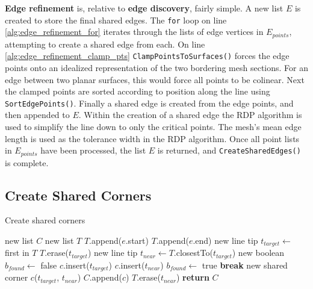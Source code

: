 \textbf{Edge refinement} is, relative to \textbf{edge discovery}, fairly simple.
A new list $E$ is created to store the final shared edges.
The \verb|for| loop on line \ref{alg:edge_refinement_for} iterates through the lists of edge vertices in $E_{points}$, attempting to create a shared edge from each.
On line \ref{alg:edge_refinement_clamp_pts} \verb|ClampPointsToSurfaces()| forces the edge points onto an idealized representation of the two bordering mesh sections.
For an edge between two planar surfaces, this would force all points to be colinear.
Next the clamped points are sorted according to position along the line using \verb|SortEdgePoints()|.
Finally a shared edge is created from the edge points, and then appended to $E$.
Within the creation of a shared edge the RDP algorithm is used to simplify the line down to only the critical points.
The mesh's mean edge length is used as the tolerance width in the RDP algorithm.
Once all point lists in $E_{points}$ have been processed, the list $E$ is returned, and \verb|CreateSharedEdges()| is complete.

\subsection{Create Shared Corners}

\begin{algorithm}[!b]
	\caption{Create shared corners}\label{alg:shared_corners}
\begin{algorithmic}[1]
	\State new list $C$ 
		\State new list $T$ 
			\State $T$.append($e$.start)
			\State $T$.append($e$.end)
		\EndFor
			\State new line tip $t_{target} \leftarrow$ first in $T$
			\State $T$.erase($t_{target}$)
			\State new line tip $t_{near} \leftarrow T$.closestTo($t_{target}$)
			\State new boolean $b_{found} \leftarrow$ false
					\State $c$.insert($t_{target}$)
					\State $c$.insert($t_{near}$)
					\State $b_{found} \leftarrow$ true
					\State \textbf{break}
				\EndIf
			\EndFor
				\State new shared corner $c$($t_{target}$, $t_{near}$)
				\State $C$.append($c$)
			\EndIf
			\State $T$.erase($t_{near}$)
		\EndWhile
	\EndFor
	\State \textbf{return} $C$
\EndFunction
\end{algorithmic}
\end{algorithm}

